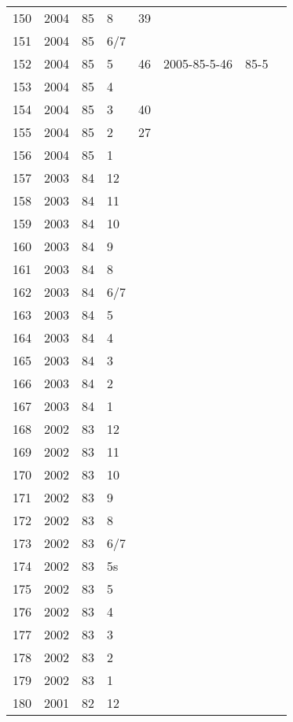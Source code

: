 \begin{longtable}{ |l|l|l|l|l|l|l|l| }
150 & 2004 & 85 &     8 &      39 &  &  & \\
151 & 2004 & 85 &   6/7 &         &  &  & \\
152 & 2004 & 85 &     5 &      46 & 2005-85-5-46 & 85-5 & \\
153 & 2004 & 85 &     4 &         &  &  & \\
154 & 2004 & 85 &     3 &      40 &  &  & \\
155 & 2004 & 85 &     2 &      27 &  &  & \\
156 & 2004 & 85 &     1 &         &  &  & \\
157 & 2003 & 84 &    12 &         &  &  & \\
158 & 2003 & 84 &    11 &         &  &  & \\
159 & 2003 & 84 &    10 &         &  &  & \\
160 & 2003 & 84 &     9 &         &  &  & \\
161 & 2003 & 84 &     8 &         &  &  & \\
162 & 2003 & 84 &   6/7 &         &  &  & \\
163 & 2003 & 84 &     5 &         &  &  & \\
164 & 2003 & 84 &     4 &         &  &  & \\
165 & 2003 & 84 &     3 &         &  &  & \\
166 & 2003 & 84 &     2 &         &  &  & \\
167 & 2003 & 84 &     1 &         &  &  & \\
168 & 2002 & 83 &    12 &         &  &  & \\
169 & 2002 & 83 &    11 &         &  &  & \\
170 & 2002 & 83 &    10 &         &  &  & \\
171 & 2002 & 83 &     9 &         &  &  & \\
172 & 2002 & 83 &     8 &         &  &  & \\
173 & 2002 & 83 &   6/7 &         &  &  & \\
174 & 2002 & 83 &    5s &         &  &  & \\
175 & 2002 & 83 &     5 &         &  &  & \\
176 & 2002 & 83 &     4 &         &  &  & \\
177 & 2002 & 83 &     3 &         &  &  & \\
178 & 2002 & 83 &     2 &         &  &  & \\
179 & 2002 & 83 &     1 &         &  &  & \\
180 & 2001 & 82 &    12 &         &  &  & \\

\end{longtable}
